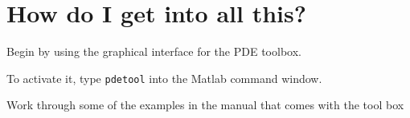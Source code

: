 \documentclass[11pt]{beamer}
\begin{document}
\section{How do I get into all this?}

\begin{frame}

\bi
  \item Begin by using the graphical interface for the PDE
  toolbox.
  \item To activate it, type \texttt{pdetool} into the Matlab
  command window.
  \item Work through some of the examples in the manual that comes
  with the tool box
\ei

\end{frame}
\end{document}
